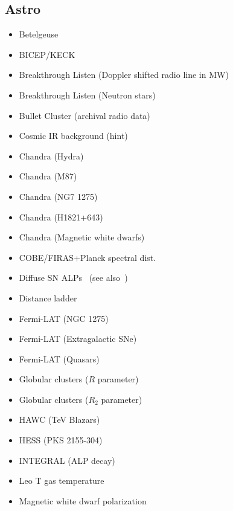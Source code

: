 \documentclass[10pt,twocolumn]{extarticle}
\begin{document}
\begin{mdframed}[everyline=true]
\subsection*{Astro}\vspace{-0.5em}
\begin{itemize}\setlength\itemsep{-0.5em}
	\item Betelgeuse~\cite{Xiao:2020pra}
	\item BICEP/KECK~\cite{BICEPKeck:2021sbt}
	\item Breakthrough Listen (Doppler shifted radio line in MW)~\cite{Keller:2021zbl}
	\item Breakthrough Listen (Neutron stars)~\cite{Foster:2022fxn}
    \item Bullet Cluster (archival radio data)~\cite{Chan:2021gjl}
  	\item Cosmic IR background (hint)~\cite{Kohri:2017ljt}
    \item Chandra (Hydra)~\cite{Wouters:2013hua}
    \item Chandra (M87)~\cite{Marsh:2017yvc}
    \item Chandra (NG7 1275)~\cite{Reynolds:2019uqt}
    \item Chandra (H1821+643)~\cite{Reynes:2021bpe}
    \item Chandra (Magnetic white dwarfs)~\cite{Reynes:2021bpe}
    \item COBE/FIRAS+Planck spectral dist.~\cite{Bolliet:2020ofj}
    \item Diffuse SN ALPs~\cite{Calore:2021hhn} (see also~\cite{Calore:2020tjw})
    \item Distance ladder~\cite{Buen-Abad:2020zbd}
    \item Fermi-LAT (NGC 1275)~\cite{Fermi-LAT:2016nkz}
    \item Fermi-LAT (Extragalactic SNe)~\cite{Meyer:2020vzy}
   	\item Fermi-LAT (Quasars)~\cite{Davies:2022wvj}
    \item Globular clusters ($R$ parameter)~\cite{Ayala:2014pea}
    \item Globular clusters ($R_2$ parameter)~\cite{Dolan:2022kul}
    \item HAWC (TeV Blazars)~\cite{Jacobsen:2022swa}
    \item HESS (PKS 2155-304)~\cite{HESS:2013udx}
    \item INTEGRAL (ALP decay)~\cite{Calore:2022pks}
    \item Leo T gas temperature~\cite{Wadekar:2021qae}
    \item Magnetic white dwarf polarization~\cite{Dessert:2022yqq}

\end{itemize}
\end{mdframed}
\end{document}
